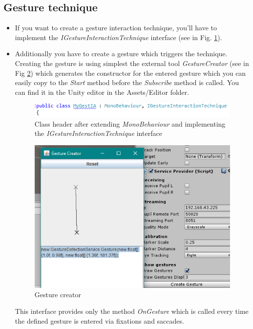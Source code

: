 \documentclass[../../Instructions_Framework]{subfiles}
\begin{document}
\subsection{Gesture technique}
\begin{itemize}
\item If you want to create a gesture interaction technique, you'll have to implement the \textit{IGestureInteractionTechnique} interface (see in Fig. \ref{fig:interfacegesten}).
\item Additionally you have to create a gesture which triggers the technique. Creating the gesture is using simplest the external tool \textit{GestureCreator} (see in Fig \ref{fig:creator}) which generates the constructor for the entered gesture which you can easily copy to the \textit{Start} method before the \textit{Subscribe} method is called. You can find it in the Unity editor  in the Assets/Editor folder.\\

\begin{figure}
	\centering
	\includegraphics[width=0.7\linewidth]{img/InterfaceGest}
	\caption{Class header after extending \textit{MonoBehaviour} and implementing the \textit{IGestureInteractionTechnique} interface}
	\label{fig:interfacegesten}
\end{figure}
\begin{figure}
	\centering
	\includegraphics[width=0.7\linewidth]{img/creator}
	\caption{Gesture creator}
	\label{fig:creator}
\end{figure}
This interface provides only the method \textit{OnGesture} which is called every time the defined gesture is entered via fixations and saccades.
\end{itemize}
\end{document}
